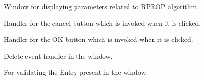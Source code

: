 \documentclass[letterpaper,10pt,english]{sphinxmanual}
\begin{document}
\begin{fulllineitems}
\label{index:rprop.rprop}
Window for displaying parameters related to RPROP algorithm.


\begin{fulllineitems}
\label{index:rprop.rprop.on_cancel}
Handler for the cancel button which is invoked when it is clicked.

\end{fulllineitems}



\begin{fulllineitems}
\label{index:rprop.rprop.on_ok}
Handler for the OK button which is invoked when it is clicked.

\end{fulllineitems}



\begin{fulllineitems}
\label{index:rprop.rprop.on_rprop_window_delete_event}
Delete event handler in the window.

\end{fulllineitems}



\begin{fulllineitems}
\label{index:rprop.rprop.validate}
For validating the Entry present in the window.

\end{fulllineitems}


\end{fulllineitems}

\label{index:module-train_window}
\end{document}
